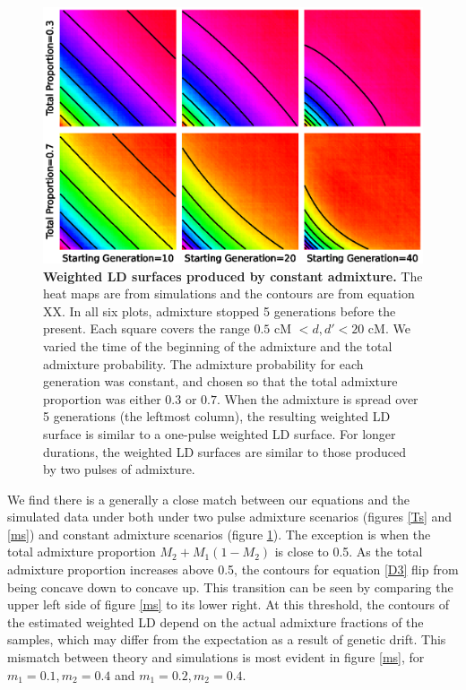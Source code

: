 \begin{figure}
\includegraphics[scale=.8]{continuous.eps}
\caption{
{\bf Weighted LD surfaces produced by constant admixture.} The heat maps are from simulations and the contours are from equation XX. In all six plots, admixture stopped 5 generations before the present. Each square covers the range $0.5 \text{ cM }<d,d'<20\text{ cM}$. We varied the time of the beginning of the admixture and the total admixture probability. The admixture probability for each generation was constant, and chosen so that the total admixture proportion was either $0.3$ or $0.7$. When the admixture is spread over 5 generations (the leftmost column), the resulting weighted LD surface is similar to a one-pulse weighted LD surface. For longer durations, the weighted LD surfaces are similar to those produced by two pulses of admixture.
}
\label{continuous}
\end{figure}

We find there is a generally a close match between our equations and the simulated data under both under two pulse admixture scenarios (figures \ref{Ts} and \ref{ms}) and constant admixture scenarios (figure \ref{continuous}). The exception is when the total admixture proportion $M_2+M_1(1-M_2)$ is close to 0.5. As the total admixture proportion increases above 0.5, the contours for equation \ref{D3} flip from being concave down to concave up. This transition can be seen by comparing the upper left side of figure \ref{ms} to its lower right. At this threshold, the contours of the estimated weighted LD depend on the actual admixture fractions of the samples, which may differ from the expectation as a result of genetic drift. This mismatch between theory and simulations is most evident in figure \ref{ms}, for $m_1=0.1,m_2=0.4$ and $m_1=0.2,m_2=0.4$. 

